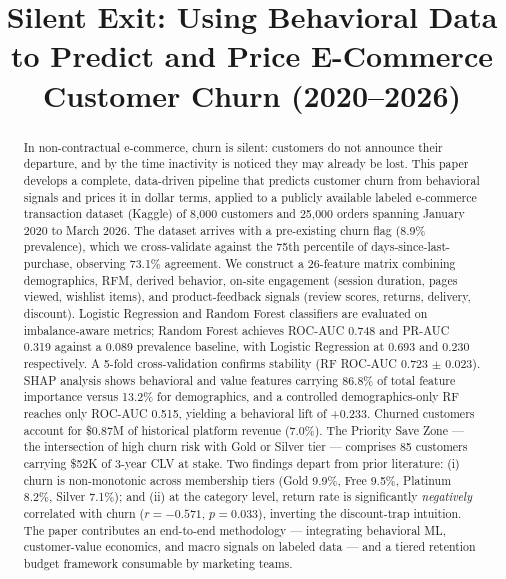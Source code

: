 \documentclass[conference]{IEEEtran}
\begin{document}
\title{Silent Exit: Using Behavioral Data to Predict and Price E-Commerce Customer Churn (2020--2026)}

\author{
}

\maketitle

\begin{abstract}
In non-contractual e-commerce, churn is silent: customers do not announce their departure, and by the time inactivity is noticed they may already be lost. This paper develops a complete, data-driven pipeline that predicts customer churn from behavioral signals and prices it in dollar terms, applied to a publicly available labeled e-commerce transaction dataset (Kaggle) of 8{,}000 customers and 25{,}000 orders spanning January 2020 to March 2026. The dataset arrives with a pre-existing churn flag (8.9\% prevalence), which we cross-validate against the 75th percentile of days-since-last-purchase, observing 73.1\% agreement. We construct a 26-feature matrix combining demographics, RFM, derived behavior, on-site engagement (session duration, pages viewed, wishlist items), and product-feedback signals (review scores, returns, delivery, discount). Logistic Regression and Random Forest classifiers are evaluated on imbalance-aware metrics; Random Forest achieves ROC-AUC 0.748 and PR-AUC 0.319 against a 0.089 prevalence baseline, with Logistic Regression at 0.693 and 0.230 respectively. A 5-fold cross-validation confirms stability (RF ROC-AUC 0.723 $\pm$ 0.023). SHAP analysis shows behavioral and value features carrying 86.8\% of total feature importance versus 13.2\% for demographics, and a controlled demographics-only RF reaches only ROC-AUC 0.515, yielding a behavioral lift of +0.233. Churned customers account for \$0.87M of historical platform revenue (7.0\%). The Priority Save Zone — the intersection of high churn risk with Gold or Silver tier — comprises 85 customers carrying \$52K of 3-year CLV at stake. Two findings depart from prior literature: (i) churn is non-monotonic across membership tiers (Gold 9.9\%, Free 9.5\%, Platinum 8.2\%, Silver 7.1\%); and (ii) at the category level, return rate is significantly \emph{negatively} correlated with churn ($r = -0.571$, $p = 0.033$), inverting the discount-trap intuition. The paper contributes an end-to-end methodology — integrating behavioral ML, customer-value economics, and macro signals on labeled data — and a tiered retention budget framework consumable by marketing teams.
\end{abstract}
\end{document}
